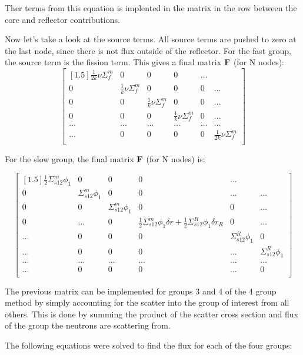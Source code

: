 \documentclass[../main.tex]{subfiles}
\begin{document}
Ther terms from this equation is implented in the matrix in the row between the core and reflector contributions.

Now let's take a look at the source terms.  All source terms are pushed to zero at the last node, since there is not flux outside of the reflector.  For the fast group, the source term  is the fission term.  This gives a final matrix $\mathbf{F}$ (for N nodes):
	\[
	\begin{bmatrix}[1.5]
		\frac{1}{2k} \nu \Sigma^m_f  & 0 & 0 & 0 & \dots\\
		0 & \frac{1}{k} \nu \Sigma^m_f  & 0 & 0 & 0 & \dots \\
		0 & 0 & \frac{1}{k} \nu \Sigma^m_f  & 0 & 0 & \dots\\
		0 & 0 & 0 & \frac{1}{k} \nu \Sigma^m_f  & 0 & \dots \\
		\dots & \dots & \dots & \dots & \dots & \dots \\
		\dots & 0 & 0 & 0 & 0 & \frac{1}{2k} \nu \Sigma^m_f  \\
	\end{bmatrix}
	\]
	
For the slow group, the final matrix $\mathbf{F}$ (for N nodes) is:

\[
	\begin{bmatrix}[1.5]
		\frac{1}{2} \Sigma^m_{s12} \phi_1  & 0 & 0 & 0 & \dots\\
		0 & \Sigma^m_{s12} \phi_1 & 0 & 0 & \dots & \dots \\
		0 & 0 & \Sigma^m_{s12} \phi_1 & 0 & 0 & \dots\\
		0 & \dots & 0 & \frac{1}{2} \Sigma^m_{s12} \phi_1 \delta r + \frac{1}{2} \Sigma^R_{s12} \phi_1 \delta r_R  & 0 & \dots \\
		\dots & 0 & 0 & 0 & \Sigma^R_{s12} \phi_1 & 0 \\
		\dots & 0 & 0 & 0 & \dots & \Sigma^R_{s12} \phi_1 \\
		\dots & \dots & \dots & \dots & \dots & \dots \\
		\dots & 0 & 0 & 0 & \dots & 0 \\
	\end{bmatrix}
	\]

The previous matrix can be implemented for groups 3 and 4 of the 4 group method by simply accounting for the scatter into the group of interest from all others.  This is done by summing the product of the scatter cross section and flux of the group the neutrons are scattering from.

The following equations were solved to find the flux for each of the four groups:
\end{document}
